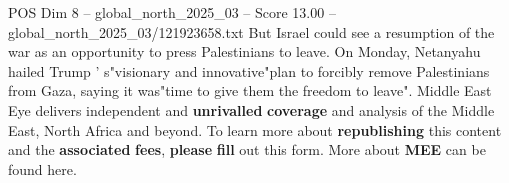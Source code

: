 \begin{textsample}{POS Dim 8 – global\_north\_2025\_03 – Score 13.00 – global\_north\_2025\_03/121923658.txt}
But Israel could see a resumption of the war as an opportunity to press Palestinians to leave.
On Monday, Netanyahu hailed Trump ' s"visionary and innovative"plan to forcibly remove Palestinians from Gaza, saying it was"time to give them the freedom to leave".
Middle East Eye delivers independent and \textbf{unrivalled} \textbf{coverage} and analysis of the Middle East, North Africa and beyond.
To learn more about \textbf{republishing} this content and the \textbf{associated} \textbf{fees}, \textbf{please} \textbf{fill} out this form.
More about \textbf{MEE} can be found here.

\end{textsample}
